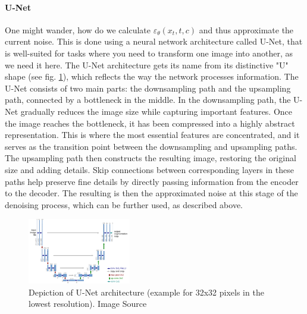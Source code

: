 \documentclass[11pt]{article}
\begin{document}
\paragraph{U-Net}
One might wander, how do we calculate $\varepsilon_\theta(x_t,t,c)$ and thus approximate the current noise. This is done using a neural network architecture called U-Net\cite{ronneberger2015unetconvolutionalnetworksbiomedical}, that is well-suited for tasks where you need to transform one image into another, as we need it here.
The U-Net architecture gets its name from its distinctive "U" shape (see fig. \ref{fig:unet}), which reflects the way the network processes information. The U-Net consists of two main parts: the downsampling path  and the upsampling path, connected by a bottleneck in the middle.
In the downsampling path, the U-Net gradually reduces the image size while capturing important features. Once the image reaches the bottleneck, it has been compressed into a highly abstract representation. This is where the most essential features are concentrated, and it serves as the transition point between the downsampling and upsampling paths. The upsampling path then constructs the resulting image, restoring the original size and adding details. Skip connections between corresponding layers in these paths help preserve fine details by directly passing information from the encoder to the decoder.
The resulting is then the approximated noise at this stage of the denoising process, which can be further used, as described above.

\begin{figure}[h]
    \centering
    \includegraphics[width=0.4\textwidth]{assets/u-net-illustration-correct-scale2.pdf}
    \caption{Depiction of U-Net architecture (example for 32x32 pixels in the lowest resolution). Image Source \cite{ronneberger2015unetconvolutionalnetworksbiomedical}}
    \label{fig:unet}
\end{figure}
\end{document}
